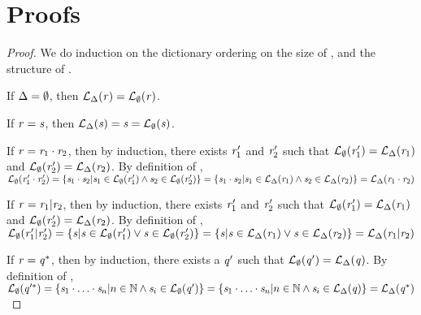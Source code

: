 \section{Proofs}

\ecrc*
\begin{proof}
We do induction on the dictionary ordering on the size of \RegexContext{},
and the structure of \Regex{}.

If $\Delta=\emptyset$, then $\mathcal{L}_{\Delta}(\mathit{r}) =
\mathcal{L}_{\emptyset}(\mathit{r})$.

If $\mathit{r}=\mathit{s}$, then $\mathcal{L}_{\Delta}(\mathit{s}) = \mathit{s} =
\mathcal{L}_{\emptyset}(\mathit{s})$.

If $\mathit{r}=\mathit{r}_1\cdot\mathit{r}_2$, then by induction, there exists
$\mathit{r}_1'$ and $\mathit{r}_2'$ such that
$\mathcal{L}_{\emptyset}(\mathit{r}_1')=\mathcal{L}_{\Delta}(\mathit{r}_1)$
and $\mathcal{L}_{\emptyset}(\mathit{r}_2')=\mathcal{L}_{\Delta}(\mathit{r}_2)$.
By definition of \Language{},
$\mathcal{L}_{\emptyset}(\mathit{r}_1'\cdot\mathit{r}_2')=
\{\mathit{s}_1\cdot\mathit{s}_2 | \mathit{s}_1\in\mathcal{L}_{\emptyset}(\mathit{r}_1') \wedge \mathit{s}_2\in\mathcal{L}_{\emptyset}(\mathit{r}_2')\}=
\{\mathit{s}_1\cdot\mathit{s}_2 | \mathit{s}_1\in\mathcal{L}_{\Delta}(\mathit{r}_1) \wedge \mathit{s}_2\in\mathcal{L}_{\Delta}(\mathit{r}_2)\}=
\mathcal{L}_{\Delta}(\mathit{r}_1\cdot\mathit{r}_2)$

If $\mathit{r}=\mathit{r}_1|\mathit{r}_2$, then by induction, there exists
$\mathit{r}_1'$ and $\mathit{r}_2'$ such that
$\mathcal{L}_{\emptyset}(\mathit{r}_1')=\mathcal{L}_{\Delta}(\mathit{r}_1)$
and $\mathcal{L}_{\emptyset}(\mathit{r}_2')=\mathcal{L}_{\Delta}(\mathit{r}_2)$.
By definition of \Language{},
$\mathcal{L}_{\emptyset}(\mathit{r}_1'|\mathit{r}_2')=
\{\mathit{s} | \mathit{s}\in\mathcal{L}_{\emptyset}(\mathit{r}_1') \vee \mathit{s}\in\mathcal{L}_{\emptyset}(\mathit{r}_2')\}=
\{\mathit{s} | \mathit{s}\in\mathcal{L}_{\Delta}(\mathit{r}_1) \vee \mathit{s}\in\mathcal{L}_{\Delta}(\mathit{r}_2)\}=
\mathcal{L}_{\Delta}(\mathit{r}_1|\mathit{r}_2)$

If $\mathit{r}=\mathit{q}^*$, then by induction, there exists a
$\mathit{q}'$ such that
$\mathcal{L}_{\emptyset}(\mathit{q}')=\mathcal{L}_{\Delta}(\mathit{q})$.
By definition of \Language{},
$\mathcal{L}_{\emptyset}(\mathit{q}'^*)=
\{\mathit{s}_1\cdot\ldots\cdot\mathit{s}_n | n\in\mathbb{N} \wedge \mathit{s}_i\in\mathcal{L}_{\emptyset}(\mathit{q}')\}=
\{\mathit{s}_1\cdot\ldots\cdot\mathit{s}_n | n\in\mathbb{N} \wedge \mathit{s}_i\in\mathcal{L}_{\Delta}(\mathit{q})\}=
\mathcal{L}_{\Delta}(\mathit{q}^*)$


\end{proof}
